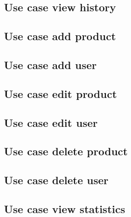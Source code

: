 \documentclass[titlepage, a4paper, 12pt]{article}
\begin{document}
\subsection{Use case view history}
\subsection{Use case add product}
\subsection{Use case add user}
\subsection{Use case edit product}
\subsection{Use case edit user}
\subsection{Use case delete product}
\subsection{Use case delete user}
\subsection{Use case view statistics}
\end{document}
